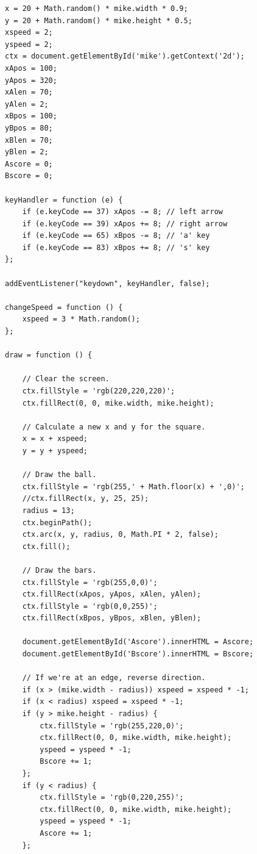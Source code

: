 \documentclass[11pt]{article}
\begin{document}
\begin{verbatim}
x = 20 + Math.random() * mike.width * 0.9;
y = 20 + Math.random() * mike.height * 0.5;
xspeed = 2;
yspeed = 2;
ctx = document.getElementById('mike').getContext('2d');
xApos = 100;
yApos = 320;
xAlen = 70;
yAlen = 2;
xBpos = 100;
yBpos = 80;
xBlen = 70;
yBlen = 2;
Ascore = 0;
Bscore = 0;

keyHandler = function (e) {
    if (e.keyCode == 37) xApos -= 8; // left arrow
    if (e.keyCode == 39) xApos += 8; // right arrow
    if (e.keyCode == 65) xBpos -= 8; // 'a' key
    if (e.keyCode == 83) xBpos += 8; // 's' key
};

addEventListener("keydown", keyHandler, false);

changeSpeed = function () {
    xspeed = 3 * Math.random();
};

draw = function () {

    // Clear the screen.
    ctx.fillStyle = 'rgb(220,220,220)';
    ctx.fillRect(0, 0, mike.width, mike.height);

    // Calculate a new x and y for the square.
    x = x + xspeed;
    y = y + yspeed;

    // Draw the ball.
    ctx.fillStyle = 'rgb(255,' + Math.floor(x) + ',0)';
    //ctx.fillRect(x, y, 25, 25);
    radius = 13;
    ctx.beginPath();
    ctx.arc(x, y, radius, 0, Math.PI * 2, false);
    ctx.fill();

    // Draw the bars.
    ctx.fillStyle = 'rgb(255,0,0)';
    ctx.fillRect(xApos, yApos, xAlen, yAlen);
    ctx.fillStyle = 'rgb(0,0,255)';
    ctx.fillRect(xBpos, yBpos, xBlen, yBlen);

    document.getElementById('Ascore').innerHTML = Ascore;
    document.getElementById('Bscore').innerHTML = Bscore;

    // If we're at an edge, reverse direction.
    if (x > (mike.width - radius)) xspeed = xspeed * -1;
    if (x < radius) xspeed = xspeed * -1;
    if (y > mike.height - radius) {
        ctx.fillStyle = 'rgb(255,220,0)';
        ctx.fillRect(0, 0, mike.width, mike.height);
        yspeed = yspeed * -1;
        Bscore += 1;
    };
    if (y < radius) {
        ctx.fillStyle = 'rgb(0,220,255)';
        ctx.fillRect(0, 0, mike.width, mike.height);
        yspeed = yspeed * -1;
        Ascore += 1;
    };


\end{verbatim}
\end{document}
